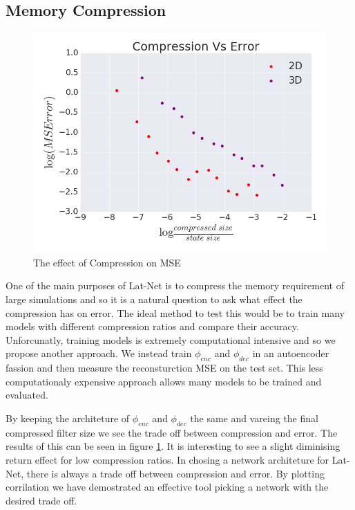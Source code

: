 \documentclass{article}
\begin{document}
\subsection{Memory Compression}

\begin{figure}
  \centering
  \includegraphics[scale=0.3]{../test/figs/compression_error_plot.png}
  \caption{The effect of Compression on MSE}
  \label{compression_plot}
\end{figure}

One of the main purposes of Lat-Net is to compress the memory requirement of large simulations and so it is a natural question to ask what effect the compression has on error. The ideal method to test this would be to train many models with different compression ratios and compare their accuracy. Unforcunatly, training models is extremely computational intensive and so we propose another approach. We instead train $\phi_{enc}$ and $\phi_{dec}$ in an autoencoder fassion and then measure the reconsturction MSE on the test set. This less computationaly expensive approach allows many models to be trained and evaluated.

By keeping the architeture of $\phi_{enc}$ and $\phi_{dec}$ the same and vareing the final compressed filter size we see the trade off between compression and error. The results of this can be seen in figure \ref{compression_plot}. It is interesting to see a slight diminising return effect for low compression ratios. In chosing a network architeture for Lat-Net, there is always a trade off between compression and error. By plotting corrilation we have demostrated an effective tool picking a network with the desired trade off.
\end{document}
